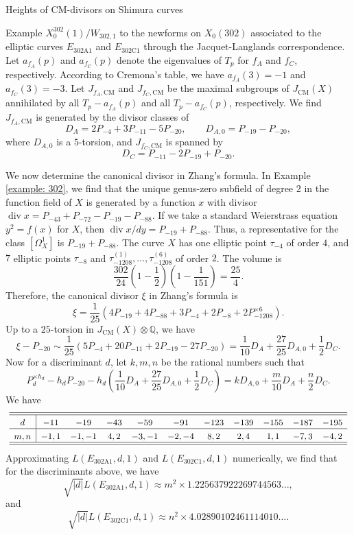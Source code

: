 \documentclass{amsart}
\theoremstyle{definition}
\def\Q{\mathbb Q}
\def\CM{\mathrm{CM}}
\def\div{\operatorname{div}}
\begin{document}
\begin{section}{Heights of CM-divisors on Shimura curves}
\begin{subsection}{Example $X_0^{302}(1)/W_{302,1}$}
to the newforms on $X_0(302)$ associated to the elliptic curves
$E_{\mathrm{302A1}}$ and $E_{\mathrm{302C1}}$ through the
Jacquet-Langlands correspondence. Let $a_{f_A}(p)$ and $a_{f_C}(p)$
denote the eigenvalues of $T_p$ for $f_A$ and $f_C$, respectively.
According to Cremona's table, we have $a_{f_A}(3)=-1$ and
$a_{f_C}(3)=-3$. Let $J_{f_A,\CM}$ and
$J_{f_C,\CM}$ be the maximal subgroups of $J_\CM(X)$ annihilated by
all $T_p-a_{f_A}(p)$ and all $T_p-a_{f_C}(p)$, respectively. We find
$J_{f_A,\CM}$ is generated by the divisor classes of
$$
  D_{A}=2P_{-4}+3P_{-11}-5P_{-20}, \qquad
  D_{A,0}=P_{-19}-P_{-20},
$$
where $D_{A,0}$ is a $5$-torsion, and $J_{f_C,\CM}$ is spanned by
$$
  D_C=P_{-11}-2P_{-19}+P_{-20}.
$$

We now determine the canonical divisor in Zhang's formula. In Example
\ref{example: 302}, we find that the unique genus-zero subfield of
degree $2$ in the function field of $X$ is generated by a function $x$
with divisor $\div x=P_{-43}+P_{-72}-P_{-19}-P_{-88}$. If we take a
standard Weierstrass equation $y^2=f(x)$ for $X$, then $\div
x/dy=P_{-19}+P_{-88}$. Thus, a representative for the class
$[\Omega_X^1]$ is $P_{-19}+P_{-88}$. The curve $X$ has one elliptic
point $\tau_{-4}$ of order $4$, and $7$ elliptic points $\tau_{-8}$ and
$\tau_{-1208}^{(1)},\ldots,\tau_{-1208}^{(6)}$ of order $2$. The volume is
$$
  \frac{302}{24}\left(1-\frac12\right)\left(1-\frac1{151}\right)=\frac{25}4.
$$
Therefore, the canonical divisor $\xi$ in Zhang's formula is
$$
  \xi=\frac{1}{25}\left(4P_{-19}+4P_{-88}+3P_{-4}+2P_{-8}
    +2P_{-1208}^{\times 6}\right).
$$
Up to a $25$-torsion in $J_\CM(X)\otimes\Q$, we have
$$
  \xi-P_{-20}\sim\frac1{25}\left(5P_{-4}+20P_{-11}+2P_{-19}-27P_{-20}\right)
 =\frac1{10}D_A+\frac{27}{25}D_{A,0}+\frac12D_C.
$$
Now for a discriminant $d$, let $k,m,n$ be the rational numbers such
that
$$
  P_d^{\times h_d}-h_dP_{-20}-h_d\left(\frac1{10}D_A+\frac{27}{25}D_{A,0}
  +\frac12D_C\right)=kD_{A,0}+\frac m{10}D_A+\frac n2D_C.
$$
We have
$$ \small\extrarowheight3pt
\begin{array}{c|cccccccccc} \hline\hline
 d & -11 & -19 & -43 & -59 & -91 & -123 & -139 & -155 & -187 & -195 \\
 \hline
m,n&-1,1 &-1,-1& 4,2 &-3,-1&-2,-4&  8,2 &  2,4 &  1,1 & -7,3 & -4,2
 \\ \hline\hline
\end{array}
$$
Approximating $L(E_{\mathrm{302A1}},d,1)$ and
$L(E_{\mathrm{302C1}},d,1)$ numerically, we find that for the
discriminants above, we have
$$
  \sqrt{|d|}L(E_{\mathrm{302A1}},d,1)\approx m^2\times
  1.225637922269744563\ldots,
$$
and
$$
  \sqrt{|d|}L(E_{\mathrm{302C1}},d,1)\approx n^2\times
  4.02890102461114010\ldots.
$$
\end{subsection}


\end{section}
\end{document}

